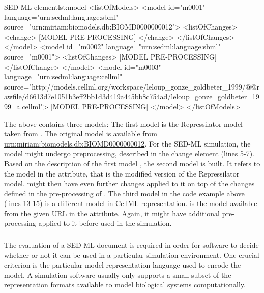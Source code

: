 
\begin{myXmlLst}{SED-ML  element}{lst:model}
<listOfModels>
	<model id="m0001" language="urn:sedml:language:sbml" 
		source="urn:miriam:biomodels.db:BIOMD0000000012">
		<listOfChanges>
			<change>
				[MODEL PRE-PROCESSING]
			</change>
		</listOfChanges> 
	</model>
	<model id="m0002" language="urn:sedml:language:sbml" source="m0001">
		<listOfChanges>
			[MODEL PRE-PROCESSING]
		</listOfChange>
	</model>
	<model id="m0003" language="urn:sedml:language:cellml" source="http://models.cellml.org/workspace/leloup_gonze_goldbeter_1999/@@rawfile/d6613d7e1051b3eff2bb1d3d419a445bb8c754ad/leloup_gonze_goldbeter_1999_a.cellml">
		[MODEL PRE-PROCESSING]
	</model>
</listOfModels>
\end{myXmlLst} 

The above  contains three models: The first model  is the Repressilator model taken from \biom. The original model is available from \url{urn:miriam:biomodels.db:BIOMD0000000012}. For the SED-ML simulation, the model might undergo preprocessing, described in the \hyperref[class:change]{change} element (lines 5-7). Based on the description of the first model , the second model is built. It refers to the model  in the  attribute, that is the modified version of the Repressilator model.  might then have even further changes applied to it on top of the changes defined in the pre-processing of . The third model in the code example above (lines 13-15) is a different model in CellML representation.  is the model available from the given URL in the  attribute. Again, it might have additional pre-processing applied to it before used in the simulation.


\subsubsection{}
\label{sec:language}
The evaluation of a SED-ML document is required in order for software to decide whether or not it can be used in a particular simulation environment. One crucial criterion is the particular model representation language used to encode the model. A simulation software usually only supports a small subset of the representation formats available to model biological systems computationally. 

